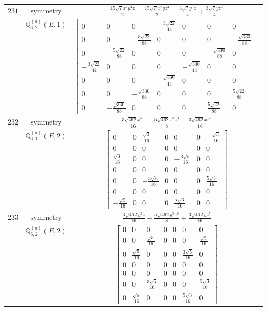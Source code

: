 \documentclass[fleqn,8pt,landscape]{jsarticle}
\begin{document}
\begin{longtable}{ccc}
$ 231 $ & $ \text{symmetry} $ & $ \frac{15 \sqrt{7} x^{2} y^{3} z}{2} - \frac{15 \sqrt{7} x^{2} y z^{3}}{2} - \frac{3 \sqrt{7} y^{5} z}{4} + \frac{3 \sqrt{7} y z^{5}}{4} $ \\
$  $ & $ \mathbb{Q}_{6,2}^{(a)}(E,1) $ & $ \begin{bmatrix} 0 & 0 & 0 & - \frac{3 \sqrt{22}}{44} & 0 & 0 & 0 \\ 0 & 0 & - \frac{5 \sqrt{22}}{88} & 0 & 0 & 0 & - \frac{\sqrt{330}}{88} \\ 0 & - \frac{5 \sqrt{22}}{88} & 0 & 0 & 0 & - \frac{\sqrt{330}}{88} & 0 \\ - \frac{3 \sqrt{22}}{44} & 0 & 0 & 0 & - \frac{\sqrt{330}}{44} & 0 & 0 \\ 0 & 0 & 0 & - \frac{\sqrt{330}}{44} & 0 & 0 & 0 \\ 0 & 0 & - \frac{\sqrt{330}}{88} & 0 & 0 & 0 & \frac{5 \sqrt{22}}{88} \\ 0 & - \frac{\sqrt{330}}{88} & 0 & 0 & 0 & \frac{5 \sqrt{22}}{88} & 0 \end{bmatrix} $ \\ \hline
$ 232 $ & $ \text{symmetry} $ & $ \frac{3 \sqrt{462} x^{5} z}{16} - \frac{5 \sqrt{462} x^{3} z^{3}}{8} + \frac{3 \sqrt{462} x z^{5}}{16} $ \\
$  $ & $ \mathbb{Q}_{6,1}^{(a)}(E,2) $ & $ \begin{bmatrix} 0 & 0 & \frac{\sqrt{3}}{16} & 0 & 0 & 0 & - \frac{\sqrt{5}}{16} \\ 0 & 0 & 0 & 0 & 0 & 0 & 0 \\ \frac{\sqrt{3}}{16} & 0 & 0 & 0 & - \frac{3 \sqrt{5}}{16} & 0 & 0 \\ 0 & 0 & 0 & 0 & 0 & 0 & 0 \\ 0 & 0 & - \frac{3 \sqrt{5}}{16} & 0 & 0 & 0 & \frac{5 \sqrt{3}}{16} \\ 0 & 0 & 0 & 0 & 0 & 0 & 0 \\ - \frac{\sqrt{5}}{16} & 0 & 0 & 0 & \frac{5 \sqrt{3}}{16} & 0 & 0 \end{bmatrix} $ \\ \hline
$ 233 $ & $ \text{symmetry} $ & $ \frac{3 \sqrt{462} y^{5} z}{16} - \frac{5 \sqrt{462} y^{3} z^{3}}{8} + \frac{3 \sqrt{462} y z^{5}}{16} $ \\
$  $ & $ \mathbb{Q}_{6,2}^{(a)}(E,2) $ & $ \begin{bmatrix} 0 & 0 & 0 & 0 & 0 & 0 & 0 \\ 0 & 0 & \frac{\sqrt{3}}{16} & 0 & 0 & 0 & \frac{\sqrt{5}}{16} \\ 0 & \frac{\sqrt{3}}{16} & 0 & 0 & 0 & \frac{3 \sqrt{5}}{16} & 0 \\ 0 & 0 & 0 & 0 & 0 & 0 & 0 \\ 0 & 0 & 0 & 0 & 0 & 0 & 0 \\ 0 & 0 & \frac{3 \sqrt{5}}{16} & 0 & 0 & 0 & \frac{5 \sqrt{3}}{16} \\ 0 & \frac{\sqrt{5}}{16} & 0 & 0 & 0 & \frac{5 \sqrt{3}}{16} & 0 \end{bmatrix} $ \\ \hline

\end{longtable}
\end{document}
